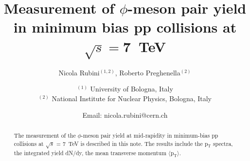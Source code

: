 \documentclass[ALICE,manyauthors]{ALICE_analysis_notes}
\begin{document}
%
%
%
\begin{titlepage}
%
\PHdate{\today}
%
\title{Measurement of $\phi$-meson pair yield in minimum bias pp collisions at $\sqrt{s}=$\SI{7}{\tera\electronvolt}}
%
\author{Nicola Rubini$^{(1,2)}$, Roberto Preghenella$^{(2)}$}
\author{
$^{(1)}$ University of Bologna, Italy\\
$^{(2)}$ National Institute for Nuclear Physics, Bologna, Italy\\
}
\author{Email: nicola.rubini@cern.ch}
%
%
\begin{abstract}
The measurement of the $\phi$-meson pair yield at mid-rapidity in minimum-bias pp collisions at $\sqrt{s}$ = \SI{7}{\tera\electronvolt} is described in this note. The results include the p$_{\text{T}}$ spectra, the integrated yield dN/dy, the mean transverse momentum $\langle \text{p}_{\text{T}} \rangle$.
\end{abstract}
\end{titlepage}
%
\tableofcontents
\newpage
%
%
\setcounter{secnumdepth}{0}

\setcounter{secnumdepth}{1}
\newpage

\newpage

\newpage

\newpage

\newpage

\newpage

\newpage

\newpage

\newpage
\appendix

\newpage
%
\printbibliography
%
\end{document}
